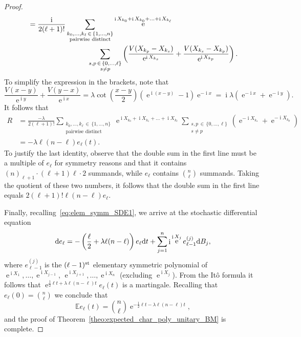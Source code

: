 \documentclass[10pt]{amsart}
\theoremstyle{definition}\newtheorem{defi}[theo]{Definition}\newtheorem{rema}[theo]{Remark}\newtheorem{exam}[theo]{Example}\newtheorem{exem}[theo]{Example}\newtheorem{nota}[theo]{Notation}
\DeclareMathOperator{\eee}{e}
\DeclareMathOperator{\ii}{i}
\newcommand{\E}{\mathbb{E}}
\newcommand*\dint{\text{\normalfont d}}
\begin{document}
\begin{proof}
\begin{align*}
&=
\frac{\ii}{2 (\ell+1)!}\sum_{\substack{k_0,\ldots, k_\ell\,\in\,\{1,\ldots, n\}\\\text{pairwise distinct}}}\eee^{\ii X_{k_0} + \ii X_{k_0} + \ldots + \ii X_{k_\ell}} \\
&\mkern150mu\sum_{\substack{s,p\,\in\,\{0,\ldots,\ell\}\\s\neq p}} \left(\frac{V(X_{k_p} - X_{k_s})}{\eee^{\ii X_{k_s}}} + \frac{V(X_{k_s} - X_{k_p})}{\eee^{\ii X_{k_p}}}\right).
\end{align*}
To simplify the expression in the brackets, note that
\[
\frac{V(x - y)}{\eee^{\ii y}} + \frac{V(y - x)}{\eee^{\ii x}} =
\lambda \cot \left(\frac {x-y}{2}\right) \left(\eee^{\ii (x-y)} - 1\right) \eee^{-\ii x} =
\ii \lambda \left(\eee^{- \ii x} + \eee^{- \ii y}\right).
\]
It follows that
\begin{align*}
R &=
\frac{-\lambda}{2 (\ell+1)!}\sum_{\substack{k_0,\ldots, k_\ell\,\in\,\{1,\ldots, n\}\\
\text{pairwise distinct}}}\eee^{\ii X_{k_0} + \ii X_{k_1} + \ldots + \ii X_{k_\ell}} \sum_{\substack{s,p\,\in\,\{0,\ldots,\ell\}\\
s\neq p}} \left(\eee^{ - \ii X_{k_s}} + \eee^{-\ii X_{k_p}}\right)\\
&= - \lambda \ell (n-\ell) e_\ell(t).
\end{align*}
To justify the last identity, observe that the double sum in the first line must be a multiple of $e_\ell$ for symmetry reasons and that it contains $(n)_{\ell+1} \cdot (\ell+1) \ell \cdot 2$ summands, while $e_\ell$ contains $\binom n \ell$ summands. Taking the quotient of these two numbers, it follows that the double sum in the first line equals $2(\ell+1)! \ell(n-\ell) e_{\ell}$.

Finally, recalling~\eqref{eq:elem_symm_SDE1}, we arrive at the stochastic differential equation
\begin{equation}\label{eq:elem_symm_SDE2}
\dint e_\ell = - \left(\frac \ell 2 + \lambda \ell (n-\ell)\right) e_\ell \dint t + \sum_{j=1}^n \ii \eee^{\ii X_j} e_{\ell-1}^{(j)} \dint B_j,
\end{equation}
where $e_{\ell-1}^{(j)}$ is the $(\ell-1)^{\text{\normalfont st}}$ elementary symmetric polynomial of $\eee^{\ii X_1},\ldots,\eee^{\ii X_{j-1}}$, $\eee^{\ii X_{j+1}}, \ldots, \eee^{\ii X_{n}}$ (excluding $\eee^{\ii X_{j}}$). From the Itô formula it follows that $\eee^{\frac 1 2 \ell t + \lambda \ell (n-\ell) t} e_\ell(t)$ is a martingale. Recalling that $e_\ell(0) = \binom n \ell$ we conclude that
\[
\E e_\ell (t) = \binom n\ell \eee^{-\frac 1 2 \ell t - \lambda \ell (n-\ell) t},
\]
and the proof of Theorem~\ref{theo:expected_char_poly_unitary_BM} is complete.
\end{proof}
\end{document}

